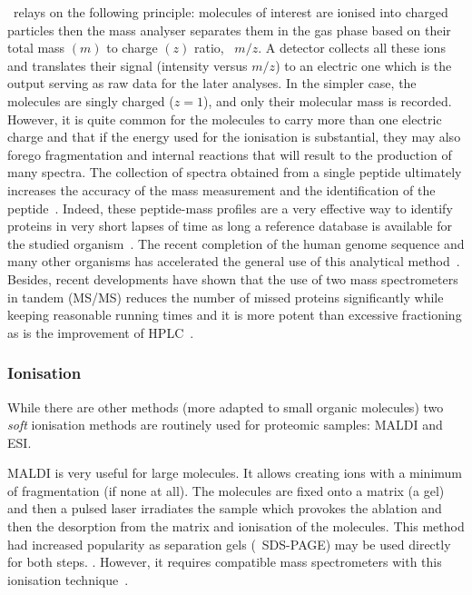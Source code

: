 \ms\ relays on the following principle: molecules of interest are ionised
into charged particles then the mass analyser separates them in the gas phase
based on their total mass $(m)$ to charge $(z)$ ratio, \ie\ $m/z$.
A detector collects all these ions and translates their signal (intensity versus
$m/z$) to an electric one which is the output serving as raw data for the
later analyses. In the simpler case, the molecules are singly charged ($z=1$),
and only their molecular mass is recorded. However, it is quite common for the
molecules to carry more than one electric charge and that if the energy used for
the ionisation is substantial, they may also forego fragmentation and internal
reactions that will result to the production of many spectra. The collection
of spectra obtained from a single peptide ultimately increases the accuracy of
the mass measurement and the identification of the peptide~.
Indeed, these peptide-mass profiles are a very effective way to identify
proteins in very short lapses of time as long a reference database is available
for the studied organism~. The recent completion of the human
genome sequence and many other organisms has accelerated the general use of this
analytical method~. Besides, recent developments have
shown that the use of two mass spectrometers in tandem (\gls{MS/MS}) reduces
the number of missed proteins significantly while keeping reasonable running
times and it is more potent than excessive fractioning as is the improvement
of \gls{HPLC}~.

\subsubsection{Ionisation}

While there are other methods (more adapted to small organic molecules)
two \emph{soft} ionisation methods are routinely used for proteomic samples:
\acrfull{MALDI} and \acrfull{ESI}.

\gls{MALDI} is very useful for large molecules. It allows creating ions with a
minimum of fragmentation (if none at all). The molecules are fixed onto a matrix
(a gel) and then a pulsed \gls{laser} irradiates the sample which provokes the
ablation and then the desorption from the matrix and ionisation of the molecules.
This method had increased popularity as separation gels (\eg\ \gls{SDS-PAGE})
may be used directly for both steps. .
However, it requires compatible mass spectrometers
with this ionisation technique~.

